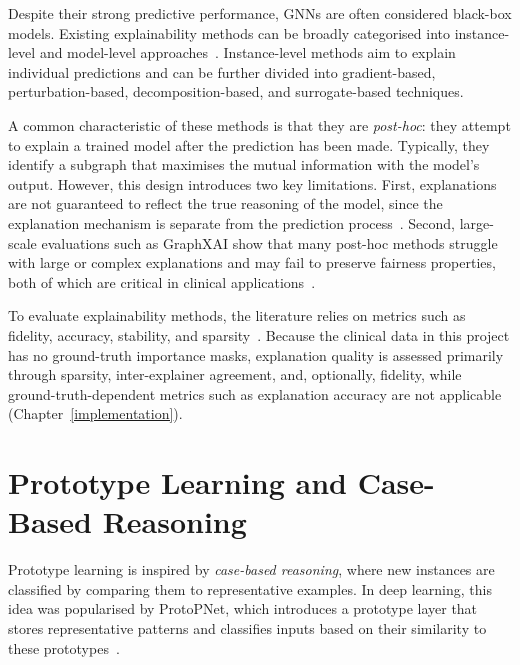 Despite their strong predictive performance, GNNs are often considered
black-box models. Existing explainability methods can be broadly categorised
into instance-level and model-level approaches~\cite{yuan2022explainability}.
Instance-level methods aim to explain individual predictions and can be further
divided into gradient-based, perturbation-based, decomposition-based, and
surrogate-based techniques.

A common characteristic of these methods is that they are \emph{post-hoc}: they
attempt to explain a trained model after the prediction has been made.
Typically, they identify a subgraph that maximises the mutual information with
the model's output. However, this design introduces two key limitations. First,
explanations are not guaranteed to reflect the true reasoning of the model,
since the explanation mechanism is separate from the prediction
process~\cite{zhang2022protgnn}. Second, large-scale evaluations such as
GraphXAI show that many post-hoc methods struggle with large or complex
explanations and may fail to preserve fairness properties, both of which are
critical in clinical applications~\cite{agarwal2023graphxai}.

To evaluate explainability methods, the literature relies on metrics such as
fidelity, accuracy, stability, and sparsity~\cite{agarwal2023graphxai}. Because
the clinical data in this project has no ground-truth importance masks,
explanation quality is assessed primarily through sparsity, inter-explainer
agreement, and, optionally, fidelity, while ground-truth-dependent metrics
such as explanation accuracy are not applicable
(Chapter~\ref{implementation}).

\section{Prototype Learning and Case-Based Reasoning}
\label{sec:proto}

Prototype learning is inspired by \emph{case-based reasoning}, where new
instances are classified by comparing them to representative examples. In deep
learning, this idea was popularised by ProtoPNet, which introduces a prototype
layer that stores representative patterns and classifies inputs based on their
similarity to these prototypes~\cite{chen2019protopnet}.

